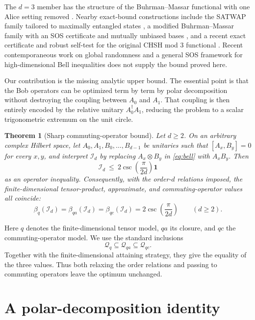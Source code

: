 \documentclass[11pt]{article}
\newtheorem{theorem}{Theorem}[section]
\theoremstyle{remark}
\newcommand{\Id}{\mathbf 1}
\newcommand{\cI}{\mathcal I}
\begin{document}
The \(d=3\) member has the structure of the Buhrman--Massar functional
\cite{BuhrmanMassar2005} with one Alice setting removed
\cite{PeritoEtAl2026}.  Nearby exact-bound constructions include the
SATWAP family tailored to maximally entangled states
\cite{SalavrakosEtAl2017}, a modified Buhrman--Massar family with an
SOS certificate and mutually unbiased bases \cite{KaniewskiEtAl2019},
and a recent exact certificate and robust self-test for the original
CHSH mod 3 functional \cite{KlepEtAl2026}.  Recent contemporaneous work
on global randomness \cite{FarkasEtAl2026,DavinoEtAl2026} and a general
SOS framework for high-dimensional Bell inequalities
\cite{CocciaEtAl2026} does not supply the bound proved here.

Our contribution is the missing analytic upper bound.  The essential point is
that the Bob operators can be optimized term by term by polar decomposition
without destroying the coupling between \(A_0\) and \(A_1\).  That coupling is
then entirely encoded by the relative unitary \(A_0^\dagger A_1\), reducing
the problem to a scalar trigonometric extremum on the unit circle.

\begin{theorem}[Sharp commuting-operator bound]
\label{thm:main}
Let \(d\geq2\).  On an arbitrary complex Hilbert space, let
\(A_0,A_1,B_0,\ldots,B_{d-1}\) be unitaries such that
\([A_x,B_y]=0\) for every \(x,y\), and interpret
\(\cI_d\) by replacing \(A_x\otimes B_y\) in \eqref{eq:bell} with
\(A_xB_y\).  Then
\begin{equation}
  \cI_d\ \leq\ 2\csc\!\left(\frac{\pi}{2d}\right)\Id
  \label{eq:operator-bound}
\end{equation}
as an operator inequality.  Consequently, with the order-\(d\) relations
imposed, the finite-dimensional tensor-product, approximate, and
commuting-operator values all coincide:
\[
  \boxed{\displaystyle
  \beta_q(\cI_d)=\beta_{qa}(\cI_d)=\beta_{qc}(\cI_d)
  =2\csc\!\left(\frac{\pi}{2d}\right)}
  \qquad(d\geq2).
\]
\end{theorem}

Here \(q\) denotes the finite-dimensional tensor model, \(qa\) its closure,
and \(qc\) the commuting-operator model.  We use the standard inclusions
\[
  \mathcal Q_q\subseteq\mathcal Q_{qa}\subseteq\mathcal Q_{qc}.
\]
Together with the finite-dimensional attaining strategy, they give the
equality of the three values.  Thus both relaxing the order relations and
passing to commuting operators leave the optimum unchanged.

\section{A polar-decomposition identity}
\end{document}
